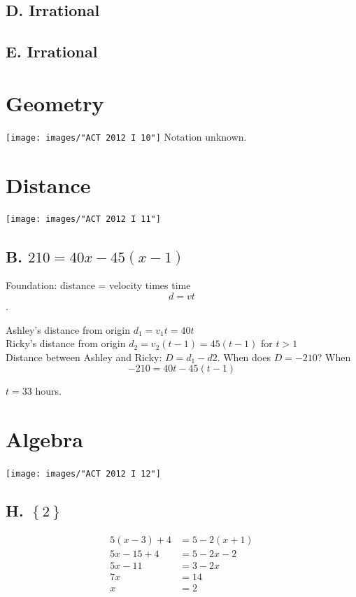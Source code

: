 \documentclass[11pt, oneside]{article}
\begin{document}
\subsection{D. Irrational}
\subsection{E. Irrational}

\section{Geometry}
\texttt{[image: images/"ACT 2012 I 10"]}
Notation unknown.

\section{Distance}
\texttt{[image: images/"ACT 2012 I 11"]}
\subsection{B. $210 = 40x - 45(x-1)$}
Foundation: distance = velocity times time 
$$d=vt$$.

\noindent Ashley's distance from origin $d_{1} = v_{1} t = 40t$\\
\noindent Ricky's distance from origin $d_{2} = v_{2} (t-1)= 45(t-1)$ for $t>1$\\

\noindent Distance between Ashley and Ricky: $D = d_{1} - d{2}$. When does $D=-210$? When
$$-210 = 40t - 45(t-1)$$

\noindent $t = 33$ hours.

\section{Algebra}
\texttt{[image: images/"ACT 2012 I 12"]}
\subsection{H. $\left\{2\right\}$}
%
\begin{equation}
	\begin{split}
		5(x-3)+4 &= 5-2(x+1) \\
		5x - 15 + 4&= 5-2x-2 \\
		5x - 11&= 3-2x \\
		7x &= 14 \\
		x&=2
	\end{split}
\end{equation}
%
\end{document}
